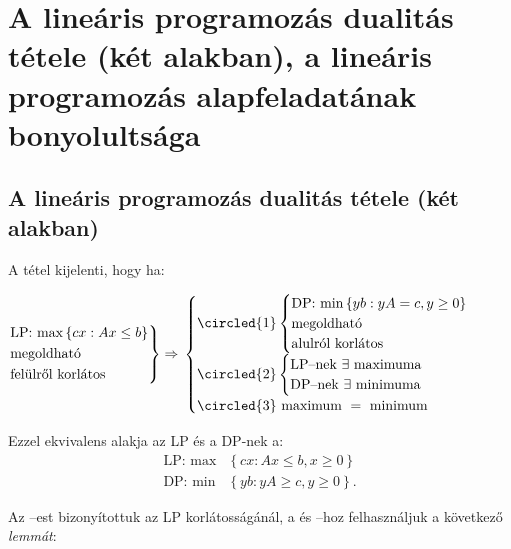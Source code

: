 \newpage
\section{A lineáris programozás dualitás tétele (két alakban),
a lineáris programozás alapfeladatának bonyolultsága}

\subsection{A lineáris programozás dualitás tétele (két alakban)}
A tétel kijelenti, hogy ha: 

$ \begin{rcases}
\mbox{LP: max}\left\{cx:Ax \leq b\right\} \\
\mbox{megoldható} \\
\mbox{felülről korlátos}
\end{rcases} \Rightarrow$ $\begin{cases}
\circled{1} \begin{cases}
\mbox{DP: min} \left\{ yb:yA = c, y \geq 0 \right\} \\
	\mbox{megoldható} \\ 
	\mbox{alulról korlátos}  
\end{cases} \\
\circled{2} \begin{cases}
\mbox{LP--nek } \exists \mbox{ maximuma} \\
\mbox{DP--nek } \exists \mbox{ minimuma} 
\end{cases}\\
\circled{3} \mbox{ maximum } = \mbox{ minimum}
\end{cases}$

Ezzel ekvivalens alakja az LP és a DP-nek a:
\begin{align*}
\mbox{LP: max} &\left\{ cx:Ax \leq b, x \geq 0 \right\} \\
\mbox{DP: min} &\left\{ yb:yA \geq c, y \geq 0 \right\}.
\end{align*}

Az --est bizonyítottuk az LP korlátosságánál, a  és 
--hoz felhasználjuk a következő \emph{lemmát}:

